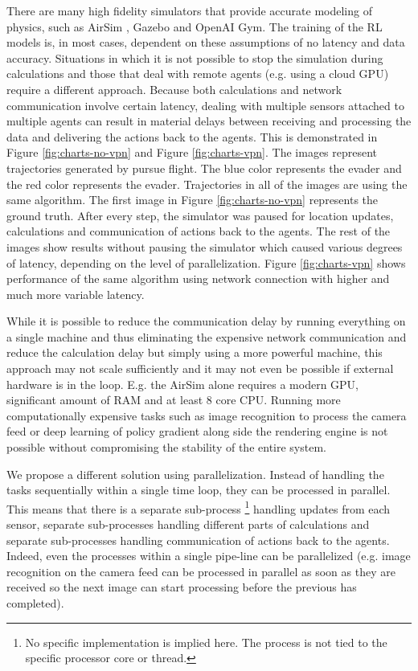 \documentclass{article}
\begin{document}
There are many high fidelity simulators that provide accurate modeling of physics, such as AirSim \cite{shah2018airsim}, Gazebo and OpenAI Gym. The training of the RL models is, in most cases, dependent on these assumptions of no latency and data accuracy. Situations in which it is not possible to stop the simulation during calculations and those that deal with remote agents (e.g. using a cloud GPU) require a different approach. Because both calculations and network communication involve certain latency, dealing with multiple sensors attached to multiple agents can result in material delays between receiving and processing the data and delivering the actions back to the agents. This is demonstrated in Figure \ref{fig:charts-no-vpn} and Figure \ref{fig:charts-vpn}. The images represent trajectories generated by pursue flight. The blue color represents the evader and the red color represents the evader. Trajectories in all of the images are using the same algorithm. The first image in Figure \ref{fig:charts-no-vpn} represents the ground truth. After every step, the simulator was paused for location updates, calculations and communication of actions back to the agents. The rest of the images show results without pausing the simulator which caused various degrees of latency, depending on the level of parallelization. Figure \ref{fig:charts-vpn} shows performance of the same algorithm using network connection with higher and much more variable latency.

While it is possible to reduce the communication delay by running everything on a single machine and thus eliminating the expensive network communication and reduce the calculation delay but simply using a more powerful machine, this approach may not scale sufficiently and it may not even be possible if external hardware is in the loop. E.g. the AirSim alone requires a modern GPU, significant amount of RAM and at least 8 core CPU. Running more computationally expensive tasks such as image recognition to process the camera feed or deep learning of policy gradient along side the rendering engine is not possible without compromising the stability of the entire system.

We propose a different solution using parallelization. Instead of handling the tasks sequentially within a single time loop, they can be processed in parallel. This means that there is a separate sub-process \footnote{No specific implementation is implied here. The process is not tied to the specific processor core or thread.} handling updates from each sensor, separate sub-processes handling different parts of calculations and separate sub-processes handling communication of actions back to the agents. Indeed, even the processes within a single pipe-line can be parallelized (e.g. image recognition on the camera feed can be processed in parallel as soon as they are received so the next image can start processing before the previous has completed).
\end{document}
